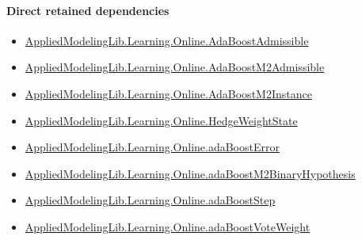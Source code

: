 \documentclass[10pt]{article}
\begin{document}
\paragraph{Direct retained dependencies}
\begin{itemize}\raggedright
\item \hyperlink{library-prerequisite-2771987b29f636cf}{Applied\allowbreak{}Modeling\allowbreak{}Lib.\allowbreak{}Learning.\allowbreak{}Online.\allowbreak{}Ada\allowbreak{}Boost\allowbreak{}Admissible}
\item \hyperlink{governing-declaration-759a42c12a885c8e}{Applied\allowbreak{}Modeling\allowbreak{}Lib.\allowbreak{}Learning.\allowbreak{}Online.\allowbreak{}Ada\allowbreak{}Boost\allowbreak{}M2\allowbreak{}Admissible}
\item \hyperlink{governing-declaration-ffa271cbdc97d5db}{Applied\allowbreak{}Modeling\allowbreak{}Lib.\allowbreak{}Learning.\allowbreak{}Online.\allowbreak{}Ada\allowbreak{}Boost\allowbreak{}M2\allowbreak{}Instance}
\item \hyperlink{library-prerequisite-8196082d02788389}{Applied\allowbreak{}Modeling\allowbreak{}Lib.\allowbreak{}Learning.\allowbreak{}Online.\allowbreak{}Hedge\allowbreak{}Weight\allowbreak{}State}
\item \hyperlink{governing-declaration-bd631eacbec4687c}{Applied\allowbreak{}Modeling\allowbreak{}Lib.\allowbreak{}Learning.\allowbreak{}Online.\allowbreak{}ada\allowbreak{}Boost\allowbreak{}Error}
\item \hyperlink{governing-declaration-0280ea55ccff19b2}{Applied\allowbreak{}Modeling\allowbreak{}Lib.\allowbreak{}Learning.\allowbreak{}Online.\allowbreak{}ada\allowbreak{}Boost\allowbreak{}M2\allowbreak{}Binary\allowbreak{}Hypothesis}
\item \hyperlink{governing-declaration-ab9e0307acbbe7ff}{Applied\allowbreak{}Modeling\allowbreak{}Lib.\allowbreak{}Learning.\allowbreak{}Online.\allowbreak{}ada\allowbreak{}Boost\allowbreak{}Step}
\item \hyperlink{governing-declaration-4fae1388d9e0485c}{Applied\allowbreak{}Modeling\allowbreak{}Lib.\allowbreak{}Learning.\allowbreak{}Online.\allowbreak{}ada\allowbreak{}Boost\allowbreak{}Vote\allowbreak{}Weight}
\end{itemize}
\end{document}
